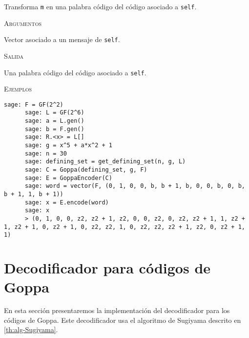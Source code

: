 \begin{description}[leftmargin=1em, font=\normalfont\ttfamily, style=nextline]
\begin{description}[font=\ttfamily, style=nextline]
    \item[encode(self, m)] Transforma \texttt{m} en una palabra código del código asociado a \texttt{self}.

    \textsc{Argumentos}
    \begin{description}[font=\normalfont\ttfamily]
        \item[m] Vector asociado a un mensaje de \texttt{self}.
    \end{description}

    \textsc{Salida}
    \begin{description}[font=\normalfont\ttfamily]
        \item[] Una palabra código del código asociado a \texttt{self}.
    \end{description}

    \textsc{Ejemplos}
    \begin{lstlisting}[gobble=4]
      sage: F = GF(2^2)
      sage: L = GF(2^6)
      sage: a = L.gen()
      sage: b = F.gen()
      sage: R.<x> = L[]
      sage: g = x^5 + a*x^2 + 1
      sage: n = 30
      sage: defining_set = get_defining_set(n, g, L)
      sage: C = Goppa(defining_set, g, F)
      sage: E = GoppaEncoder(C)
      sage: word = vector(F, (0, 1, 0, 0, b, b + 1, b, 0, 0, b, 0, b, b + 1, 1, b + 1))
      sage: x = E.encode(word)
      sage: x
      > (0, 1, 0, 0, z2, z2 + 1, z2, 0, 0, z2, 0, z2, z2 + 1, 1, z2 + 1, z2 + 1, 0, z2 + 1, 0, z2, z2, 1, 0, z2, z2, z2 + 1, z2, 0, z2 + 1, 1)
    \end{lstlisting}
  \end{description}
\end{description}

\section{Decodificador para códigos de Goppa}

En esta sección presentaremos la implementación del decodificador para los códigos de Goppa. Este decodificador usa el algoritmo de Sugiyama descrito en \ref{th:alg-Sugiyama}.

